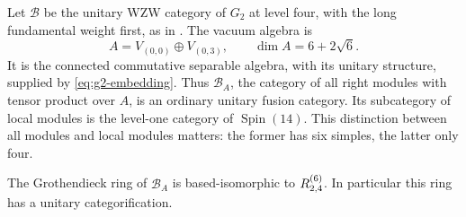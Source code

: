 Let $\mathcal B$ be the unitary WZW category of $G_2$ at level four,
with the long fundamental weight first, as in \cite{CRT}. The vacuum
algebra is
\[
 A=V_{(0,0)}\oplus V_{(0,3)},\qquad
 \dim A=6+2\sqrt6.
\]
It is the connected commutative separable algebra, with its unitary
structure, supplied by \eqref{eq:g2-embedding}. Thus $\mathcal B_A$,
the category of all right modules with tensor product over $A$, is an
ordinary unitary fusion category. Its subcategory of local modules is
the level-one category of $\operatorname{Spin}(14)$.
This distinction between all modules and local modules matters: the
former has six simples, the latter only four.

\begin{proposition}\label{prop:g2-e4}
The Grothendieck ring of $\mathcal B_A$ is based-isomorphic to
$R^{(6)}_{2,4}$. In particular this ring has a unitary categorification.
\end{proposition}
